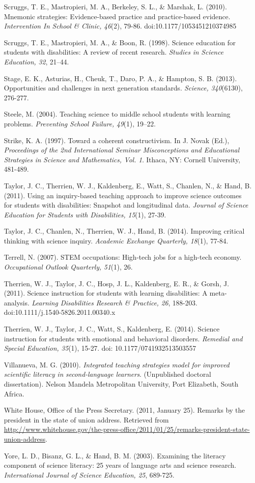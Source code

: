 \documentclass[11.5pt]{sig-alternate} %
\begin{document}
Scruggs, T. E., Mastropieri, M. A., Berkeley, S. L., \& Marshak, L. (2010).  Mnemonic strategies: Evidence-based practice and practice-based evidence. \textit{Intervention In School \& Clinic, 	46}(2), 79-86. doi:10.1177/1053451210374985

Scruggs, T. E., Mastropieri, M. A., \& Boon, R. (1998). Science education for students with 	disabilities: A review of recent research. \textit{Studies in Science Education, 32}, 21–44.

Stage, E. K., Asturias, H., Cheuk, T., Daro, P. A., \& Hampton, S. B. (2013).  Opportunities and challenges in next generation standards. \textit{Science, 340}(6130), 276-277.

Steele, M. (2004). Teaching science to middle school students with learning problems. 	\textit{Preventing School Failure, 49}(1), 19–22.

Strike, K. A. (1997).  Toward a coherent constructivism.  In J. Novak (Ed.),\textit{ Proceedings of the 2nd International Seminar Misconceptions and Educational Strategies in Science and 	Mathematics, Vol. 1}. Ithaca, NY: Cornell University, 481-489.

Taylor, J. C., Therrien, W. J., Kaldenberg, E., Watt, S., Chanlen, N., \& Hand, B. (2011). 	Using an inquiry-based teaching approach to improve science outcomes for students with 	disabilities: Snapshot and longitudinal data.  \textit{Journal of Science Education for Students 	with Disabilities, 15}(1), 27-39.

Taylor, J. C., Chanlen, N., Therrien, W. J., Hand, B. (2014).  Improving critical thinking with science inquiry.  \textit{Academic Exchange Quarterly, 18}(1), 77-84. 

Terrell, N. (2007). STEM occupations: High-tech jobs for a high-tech economy. \textit{Occupational Outlook Quarterly, 51}(1), 26.

Therrien, W. J., Taylor, J. C., Hosp, J. L., Kaldenberg, E. R., \& Gorsh, J. (2011). Science instruction for students with learning disabilities: A meta-analysis. \textit{Learning Disabilities Research \& Practice, 26}, 188-203. doi:10.1111/j.1540-5826.2011.00340.x

Therrien, W. J., Taylor, J. C., Watt, S., Kaldenberg, E. (2014). Science instruction for 	students with emotional and behavioral disorders. \textit{Remedial and Special Education, 35}(1), 15-27.  doi: 10.1177/0741932513503557

Villanueva, M. G. (2010). \textit{Integrated teaching strategies model for improved scientific literacy in second-language learners}. (Unpublished doctoral dissertation). Nelson Mandela Metropolitan University, Port Elizabeth, South Africa.

White House, Office of the Press Secretary. (2011, January 25). Remarks by the president in the state of union address. Retrieved from \url{http://www.whitehouse.gov/the-press-office/2011/01/25/remarks-president-state-union-address}.

Yore, L. D., Bisanz, G. L., \& Hand, B. M. (2003). Examining the literacy component of science 	literacy: 25 years of language arts and science research.  \textit{International Journal of Science Education, 25}, 689-725.
\end{document}

